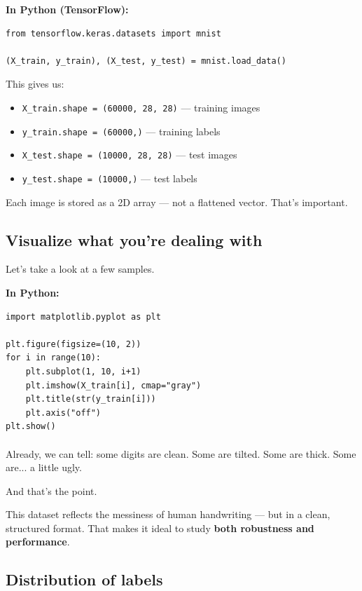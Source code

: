 \documentclass[11pt]{article}
\begin{document}
\vspace{1em}
\textbf{In Python (TensorFlow):}
\begin{verbatim}
from tensorflow.keras.datasets import mnist

(X_train, y_train), (X_test, y_test) = mnist.load_data()
\end{verbatim}

This gives us:
\begin{itemize}
    \item \texttt{X\_train.shape = (60000, 28, 28)} — training images
    \item \texttt{y\_train.shape = (60000,)} — training labels
    \item \texttt{X\_test.shape = (10000, 28, 28)} — test images
    \item \texttt{y\_test.shape = (10000,)} — test labels
\end{itemize}

Each image is stored as a 2D array — not a flattened vector. That’s important.

\subsection*{Visualize what you’re dealing with}

Let’s take a look at a few samples.

\vspace{0.5em}
\textbf{In Python:}
\begin{verbatim}
import matplotlib.pyplot as plt

plt.figure(figsize=(10, 2))
for i in range(10):
    plt.subplot(1, 10, i+1)
    plt.imshow(X_train[i], cmap="gray")
    plt.title(str(y_train[i]))
    plt.axis("off")
plt.show()
\end{verbatim}



\paragraph{} Already, we can tell: some digits are clean. Some are tilted. Some are thick. Some are... a little ugly.

And that’s the point.

This dataset reflects the messiness of human handwriting — but in a clean, structured format. That makes it ideal to study \textbf{both robustness and performance}.

\subsection*{Distribution of labels}
\end{document}
